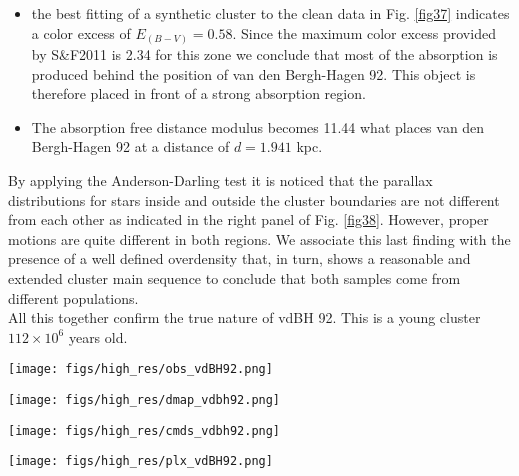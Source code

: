 \documentclass{aa}
\begin{document}
\begin{itemize}
\item [a)] the best fitting of a synthetic cluster to the clean data in Fig. 
    \ref{fig37} indicates a color excess of $E_{(B-V)} = 0.58$. Since the
    maximum color excess provided by S\&F2011 is 2.34 for this zone we
    conclude that most of the absorption is produced behind the position of van
    den Bergh-Hagen 92. This object is therefore placed in front of a strong
    absorption region.
\item [b)] The absorption free distance modulus becomes 11.44 what places van den
    Bergh-Hagen 92 at a distance of $d = 1.941$ kpc.
\end{itemize}

By applying the Anderson-Darling test it is noticed that the parallax
distributions for stars inside and outside the cluster boundaries are not
different from each other as indicated in the right panel of Fig. 
\ref{fig38}. However, proper motions are quite different in both regions. We
associate this last finding with the presence of a well defined overdensity
that, in turn, shows a
reasonable and extended cluster main sequence to conclude that both samples come
from different populations.\\

All this together confirm the true nature of vdBH 92. This is a
young cluster $112\times10^6$ years old.

\begin{figure*}[ht]
    \centering
    \texttt{[image: figs/high\_res/obs\_vdBH92.png]}
    \caption{Idem Fig. \ref{fig3} for vdBH 92.}
    \label{fig35}
\end{figure*}
\begin{figure*}[ht]
    \centering
    \texttt{[image: figs/high\_res/dmap\_vdbh92.png]}
    \caption{Idem Fig. \ref{fig4} for vdBH 92.}
    \label{fig36}
\end{figure*}
\begin{figure*}[ht]
    \centering
    \texttt{[image: figs/high\_res/cmds\_vdbh92.png]}
    \caption{Idem Fig. \ref{fig5} for vdBH 92.}
    \label{fig37}
\end{figure*}
\begin{figure*}[ht]
    \centering
    \texttt{[image: figs/high\_res/plx\_vdBH92.png]}
    \caption{Idem Fig. \ref{fig6} for vdBH 92.}
    \label{fig38}
\end{figure*}
\end{document}
